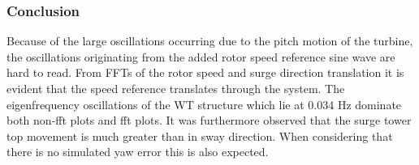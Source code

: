 \subsubsection*{Conclusion}
Because of the large oscillations occurring due to the pitch motion of the turbine, the oscillations originating from the added rotor speed reference sine wave are hard to read. From FFTs of the rotor speed and surge direction translation it is evident that the speed reference translates through the system. The eigenfrequency oscillations of the WT structure which lie at 0.034 Hz dominate both non-fft plots and fft plots. It was furthermore observed that the surge tower top movement is much greater than in sway direction. When considering that there is no simulated yaw error this is also expected.
